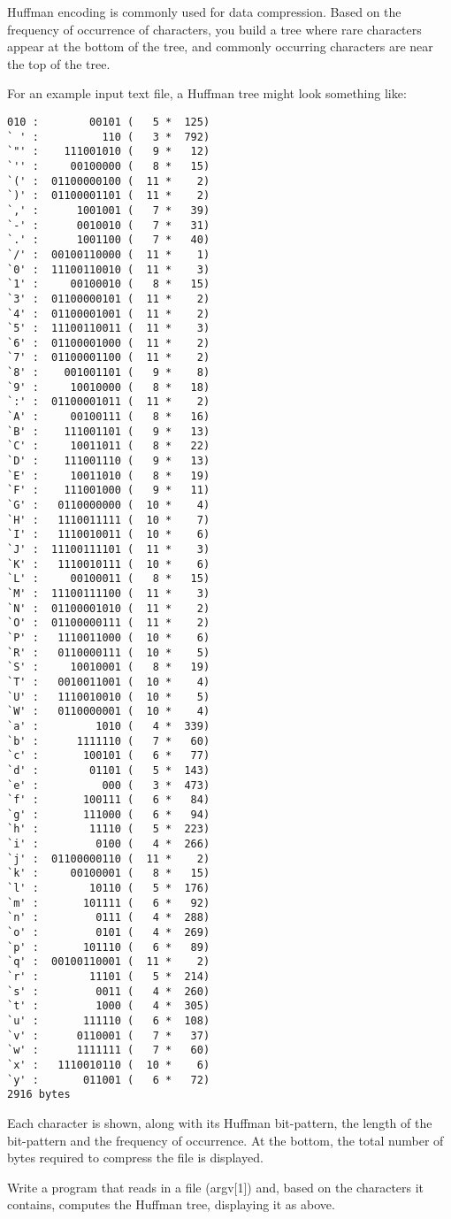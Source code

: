 Huffman encoding is commonly used for data compression.
Based on the frequency of occurrence of characters, you build
a tree where rare characters appear at the bottom of the tree, and
commonly occurring characters are near the top of the tree.

For an example input text file, a Huffman tree might look something like:

{\small
\begin{verbatim}
010 :        00101 (   5 *  125)
` ' :          110 (   3 *  792)
`"' :    111001010 (   9 *   12)
`'' :     00100000 (   8 *   15)
`(' :  01100000100 (  11 *    2)
`)' :  01100001101 (  11 *    2)
`,' :      1001001 (   7 *   39)
`-' :      0010010 (   7 *   31)
`.' :      1001100 (   7 *   40)
`/' :  00100110000 (  11 *    1)
`0' :  11100110010 (  11 *    3)
`1' :     00100010 (   8 *   15)
`3' :  01100000101 (  11 *    2)
`4' :  01100001001 (  11 *    2)
`5' :  11100110011 (  11 *    3)
`6' :  01100001000 (  11 *    2)
`7' :  01100001100 (  11 *    2)
`8' :    001001101 (   9 *    8)
`9' :     10010000 (   8 *   18)
`:' :  01100001011 (  11 *    2)
`A' :     00100111 (   8 *   16)
`B' :    111001101 (   9 *   13)
`C' :     10011011 (   8 *   22)
`D' :    111001110 (   9 *   13)
`E' :     10011010 (   8 *   19)
`F' :    111001000 (   9 *   11)
`G' :   0110000000 (  10 *    4)
`H' :   1110011111 (  10 *    7)
`I' :   1110010011 (  10 *    6)
`J' :  11100111101 (  11 *    3)
`K' :   1110010111 (  10 *    6)
`L' :     00100011 (   8 *   15)
`M' :  11100111100 (  11 *    3)
`N' :  01100001010 (  11 *    2)
`O' :  01100000111 (  11 *    2)
`P' :   1110011000 (  10 *    6)
`R' :   0110000111 (  10 *    5)
`S' :     10010001 (   8 *   19)
`T' :   0010011001 (  10 *    4)
`U' :   1110010010 (  10 *    5)
`W' :   0110000001 (  10 *    4)
`a' :         1010 (   4 *  339)
`b' :      1111110 (   7 *   60)
`c' :       100101 (   6 *   77)
`d' :        01101 (   5 *  143)
`e' :          000 (   3 *  473)
`f' :       100111 (   6 *   84)
`g' :       111000 (   6 *   94)
`h' :        11110 (   5 *  223)
`i' :         0100 (   4 *  266)
`j' :  01100000110 (  11 *    2)
`k' :     00100001 (   8 *   15)
`l' :        10110 (   5 *  176)
`m' :       101111 (   6 *   92)
`n' :         0111 (   4 *  288)
`o' :         0101 (   4 *  269)
`p' :       101110 (   6 *   89)
`q' :  00100110001 (  11 *    2)
`r' :        11101 (   5 *  214)
`s' :         0011 (   4 *  260)
`t' :         1000 (   4 *  305)
`u' :       111110 (   6 *  108)
`v' :      0110001 (   7 *   37)
`w' :      1111111 (   7 *   60)
`x' :   1110010110 (  10 *    6)
`y' :       011001 (   6 *   72)
2916 bytes
\end{verbatim}
}

Each character is shown, along with its Huffman bit-pattern, the length
of the bit-pattern and the frequency of occurrence. At the bottom, the total
number of bytes required to compress the file is displayed.

\begin{exercise}
Write a program that reads in a file (argv[1]) and, based on the characters
it contains, computes the Huffman tree, displaying it as above. 
\end{exercise}
